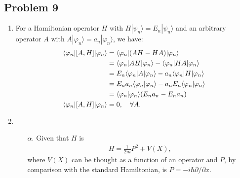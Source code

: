 \documentclass[letterpaper,11pt,twoside]{article}
\newcommand{\ket}[1]{|#1\rangle}
\newcommand{\braket}[1]{\langle#1\rangle}
\begin{document}
\subsection*{Problem 9}
\begin{enumerate}[itemsep=0pt,topsep=0pt,label=\alph*.]
  \item For a Hamiltonian operator $H$ with $H\ket{\psi_n}=E_n\ket{\psi_n}$ and an arbitrary operator $A$ with $A\ket{\varphi_n}=a_n\ket{\varphi_n}$, 
  we have:
  \begin{align}
    \braket{\varphi_n|[A,H]|\varphi_n}&=\braket{\varphi_n|(AH-HA)|\varphi_n}\notag\\
    &=\braket{\varphi_n|AH|\varphi_n}-\braket{\varphi_n|HA|\varphi_n}\notag\\
    &=E_n\braket{\varphi_n|A|\varphi_n}-a_n\braket{\varphi_n|H|\varphi_n}\notag\\
    &=E_na_n\braket{\varphi_n|\varphi_n}-a_nE_n\braket{\varphi_n|\varphi_n}\notag\\
    &=\braket{\varphi_n|\varphi_n}(E_na_n-E_na_n)\notag\\
    \braket{\varphi_n|[A,H]|\varphi_n}&=0,\quad\forall A.\label{eq:commutatormeanvalue}
  \end{align} 
  \item 
  \begin{enumerate}[itemsep=0pt,topsep=0pt]
    \item[$\alpha$.]
    Given that $H$ is 
    \begin{align*}
      H=\frac{1}{2m}P^2+V(X),
    \end{align*}
    where $V(X)$ can be thought as a function of an operator and $P$, by comparison with the standard Hamiltonian, is $P=-i\hbar\partial/\partial x$.


\end{enumerate}
\end{enumerate}
\end{document}
